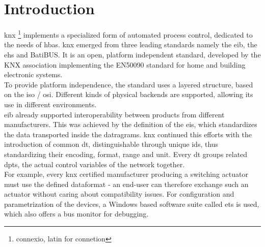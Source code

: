 \label{chap3}
\section{Introduction}

\gls{knx} \footnote{connexio, latin for connetion} implements a specialized form of automated process control, dedicated to the needs of \gls{hbas}. \gls{knx}
emerged from three leading standards namely the \gls{eib}, the \gls{ehs} and BatiBUS. It is an open, platform independent standard,
developed by the KNX association implementing the EN50090 standard for home and building electronic systems.
\\
To provide platform independence, the standard uses a layered structure, based on the \gls{iso} / \gls{osi}. Different kinds of physical backends are supported,
allowing its use in different environments.
\\
\gls{eib} already supported interoperability between products from different manufacturers. This was achieved by
the definition of the \gls{eis}, which standardizes
the data transported inside the datragrams. \gls{knx} continued this efforts with the introduction of common \gls{dt}, distinguishable through unique ids, thus
standardizing their encoding, format, range and unit.
Every \gls{dt} groups related \glspl{dpt}, the actual control variables of the network together.
\\
For example, every \gls{knx} 
certified manufacturer producing a switching actuator must use the defined dataformat - an end-user can therefore exchange such an actuator without caring
about compatibility issues. For configuration and parametrization of the devices, a Windows based software suite called \gls{ets} is used, which also offers
a bus monitor for debugging.
